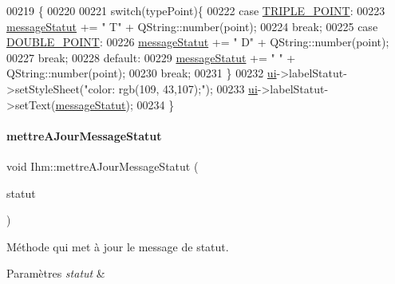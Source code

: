 \begin{DoxyCode}
00219 \{
00220 
00221     \textcolor{keywordflow}{switch}(typePoint)\{
00222         \textcolor{keywordflow}{case} \hyperlink{darts_8h_a1bd6caead3e7edd423f064b3af34e486}{TRIPLE\_POINT}:
00223             \hyperlink{class_ihm_a31a25b36e5560142cb156b8b1a25965f}{messageStatut} += \textcolor{stringliteral}{" T"} + QString::number(point);
00224         \textcolor{keywordflow}{break};
00225         \textcolor{keywordflow}{case} \hyperlink{darts_8h_af67ad443603f4dddf225d062757614ca}{DOUBLE\_POINT}:
00226             \hyperlink{class_ihm_a31a25b36e5560142cb156b8b1a25965f}{messageStatut} += \textcolor{stringliteral}{" D"} + QString::number(point);
00227         \textcolor{keywordflow}{break};
00228         \textcolor{keywordflow}{default}:
00229             \hyperlink{class_ihm_a31a25b36e5560142cb156b8b1a25965f}{messageStatut} += \textcolor{stringliteral}{" "} + QString::number(point);
00230         \textcolor{keywordflow}{break};
00231     \}
00232     \hyperlink{class_ihm_a0ac5f47856566ceeeca1720109bf70ea}{ui}->labelStatut->setStyleSheet(\textcolor{stringliteral}{"color: rgb(109, 43,107);"});
00233     \hyperlink{class_ihm_a0ac5f47856566ceeeca1720109bf70ea}{ui}->labelStatut->setText(\hyperlink{class_ihm_a31a25b36e5560142cb156b8b1a25965f}{messageStatut});
00234 \}
\end{DoxyCode}
\mbox{\label{class_ihm_a7837ec36fbac1ca96d049ad27263b951}} 
\paragraph{\texorpdfstring{mettre\+A\+Jour\+Message\+Statut}{mettreAJourMessageStatut}\hspace{0.1cm}{\footnotesize\ttfamily [2/2]}}
{\footnotesize\ttfamily void Ihm\+::mettre\+A\+Jour\+Message\+Statut (\begin{DoxyParamCaption}\item[{Q\+String}]{statut }\end{DoxyParamCaption})\hspace{0.3cm}{\ttfamily [slot]}}



Méthode qui met à jour le message de statut. 


\begin{DoxyParams}{Paramètres}
{\em statut} & \\
\hline
\end{DoxyParams}


